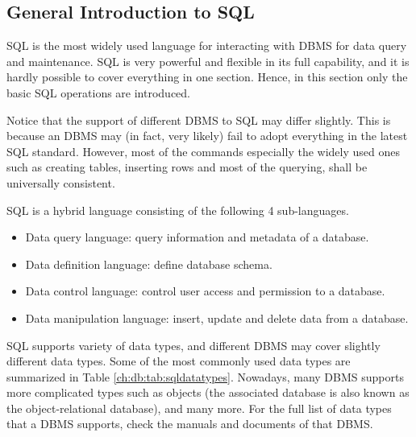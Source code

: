 \subsection{General Introduction to SQL}

SQL is the most widely used language for interacting with DBMS for data query and maintenance. SQL is very powerful and flexible in its full capability, and it is hardly possible to cover everything in one section. Hence, in this section only the basic SQL operations are introduced.

Notice that the support of different DBMS to SQL may differ slightly. This is because an DBMS may (in fact, very likely) fail to adopt everything in the latest SQL standard. However, most of the commands especially the widely used ones such as creating tables, inserting rows and most of the querying, shall be universally consistent.

SQL is a hybrid language consisting of the following 4 sub-languages.
\begin{itemize}
  \item Data query language: query information and metadata of a database.
  \item Data definition language: define database schema.
  \item Data control language: control user access and permission to a database.
  \item Data manipulation language: insert, update and delete data from a database.
\end{itemize}

SQL supports variety of data types, and different DBMS may cover slightly different data types. Some of the most commonly used data types are summarized in Table \ref{ch:db:tab:sqldatatypes}. Nowadays, many DBMS supports more complicated types such as objects (the associated database is also known as the object-relational database), and many more. For the full list of data types that a DBMS supports, check the manuals and documents of that DBMS.

